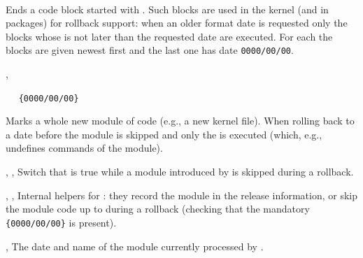 \documentclass{l3in2edoc}
\begin{document}
\begin{function}[]
  {
    \EndIncludeInRelease
  }
  \begin{syntax}
    \ \ 
  \end{syntax}
  Ends a code block started with . Such blocks
  are used in the kernel (and in packages) for rollback support: when
  an older format date is requested only the blocks whose  is
  not later than the requested date are executed. For each 
  the blocks are given newest first and the last one has date
  \texttt{0000/00/00}.
\end{function}



\begin{function}[]
  {
    \NewModuleRelease,
    \EndModuleRelease
  }
  \begin{syntax}
    \ \ 
    \texttt{\{0000/00/00\}}
    \ \ 
  \end{syntax}
  Marks a whole new module of code (e.g., a new kernel file). When
  rolling back to a date before  the module is skipped and
  only the  is executed (which, e.g., undefines
  commands of the module).
\end{function}




\begin{function}[int]
  {
    \if@skipping@module,
    \@skipping@modulefalse,
    \@skipping@moduletrue
  }
  Switch that is true while a module introduced by
   is skipped during a rollback.
\end{function}


\begin{function}[int]
  {
    \finish@module@release,
    \gobble@finish@module@release,
    \new@module@skip
  }
  Internal helpers for : they record the
  module in the release information, or skip the module code up to
   during a rollback (checking that the
  mandatory \texttt{\{0000/00/00\}} is present).
\end{function}



\begin{function}[int]
  {
    \new@moduledate,
    \new@modulename
  }
  The date and name of the module currently processed by
  .
\end{function}
\end{document}

